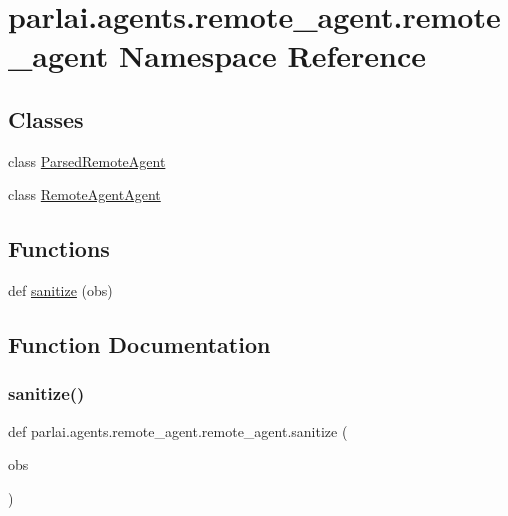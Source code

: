 \hypertarget{namespaceparlai_1_1agents_1_1remote__agent_1_1remote__agent}{}\section{parlai.\+agents.\+remote\+\_\+agent.\+remote\+\_\+agent Namespace Reference}
\label{namespaceparlai_1_1agents_1_1remote__agent_1_1remote__agent}
\subsection*{Classes}
\begin{DoxyCompactItemize}
\item 
class \hyperlink{classparlai_1_1agents_1_1remote__agent_1_1remote__agent_1_1ParsedRemoteAgent}{Parsed\+Remote\+Agent}
\item 
class \hyperlink{classparlai_1_1agents_1_1remote__agent_1_1remote__agent_1_1RemoteAgentAgent}{Remote\+Agent\+Agent}
\end{DoxyCompactItemize}
\subsection*{Functions}
\begin{DoxyCompactItemize}
\item 
def \hyperlink{namespaceparlai_1_1agents_1_1remote__agent_1_1remote__agent_a89751a1e0abc561f94b94db63d8ee2c4}{sanitize} (obs)
\end{DoxyCompactItemize}


\subsection{Function Documentation}
\mbox{\label{namespaceparlai_1_1agents_1_1remote__agent_1_1remote__agent_a89751a1e0abc561f94b94db63d8ee2c4}} 
\subsubsection{\texorpdfstring{sanitize()}{sanitize()}}
{\footnotesize\ttfamily def parlai.\+agents.\+remote\+\_\+agent.\+remote\+\_\+agent.\+sanitize (\begin{DoxyParamCaption}\item[{}]{obs }\end{DoxyParamCaption})}



